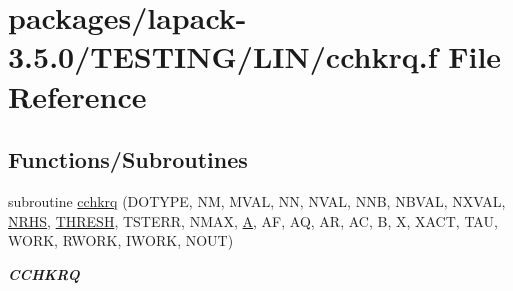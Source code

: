 \hypertarget{cchkrq_8f}{}\section{packages/lapack-\/3.5.0/\+T\+E\+S\+T\+I\+N\+G/\+L\+I\+N/cchkrq.f File Reference}
\label{cchkrq_8f}
\subsection*{Functions/\+Subroutines}
\begin{DoxyCompactItemize}
\item 
subroutine \hyperlink{group__complex__lin_ga4d5d048f134b6f378e5d1e8e7f174a3c}{cchkrq} (D\+O\+T\+Y\+P\+E, N\+M, M\+V\+A\+L, N\+N, N\+V\+A\+L, N\+N\+B, N\+B\+V\+A\+L, N\+X\+V\+A\+L, \hyperlink{example__user_8c_aa0138da002ce2a90360df2f521eb3198}{N\+R\+H\+S}, \hyperlink{zlaqgs_8c_a0656018abfc9fa2821827415f5d5ea57}{T\+H\+R\+E\+S\+H}, T\+S\+T\+E\+R\+R, N\+M\+A\+X, \hyperlink{classA}{A}, A\+F, A\+Q, A\+R, A\+C, B, X, X\+A\+C\+T, T\+A\+U, W\+O\+R\+K, R\+W\+O\+R\+K, I\+W\+O\+R\+K, N\+O\+U\+T)
\begin{DoxyCompactList}\small\item\em {\bfseries C\+C\+H\+K\+R\+Q} \end{DoxyCompactList}\end{DoxyCompactItemize}

